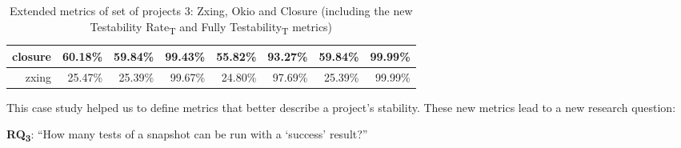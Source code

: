 \begin{table}[h!]
{\begin{tabular}{|r|r|r|r|r|r|r|r|}
            closure                                & 60.18\%                                                                                        & 59.84\%                                                                                       & 99.43\%                                                                                       & 55.82\%                                                                                      & 93.27\%                                                                                      & 59.84\%                                                                                     & 99.99\%                                                                                     \\ \hline
            zxing                                  & 25.47\%                                                                                        & 25.39\%                                                                                       & 99.67\%                                                                                       & 24.80\%                                                                                      & 97.69\%                                                                                      & 25.39\%                                                                                     & 99.99\%                                                                                    \\ \hline
        \end{tabular}
    }
    \caption{Extended metrics of set of projects 3: Zxing, Okio and Closure (including the new Testability Rate\textsubscript{T} and Fully Testability\textsubscript{T} metrics)}
    \label{table:projects-3-with-flavor-testability-rate}
\end{table}


\def \RQIII{How many tests of a snapshot can be run with a `success' result?}

This case study helped us to define metrics that better describe a project's stability. These new metrics lead to a new research question: 

\textbf{RQ\textsubscript{3}}: ``\RQIII''
